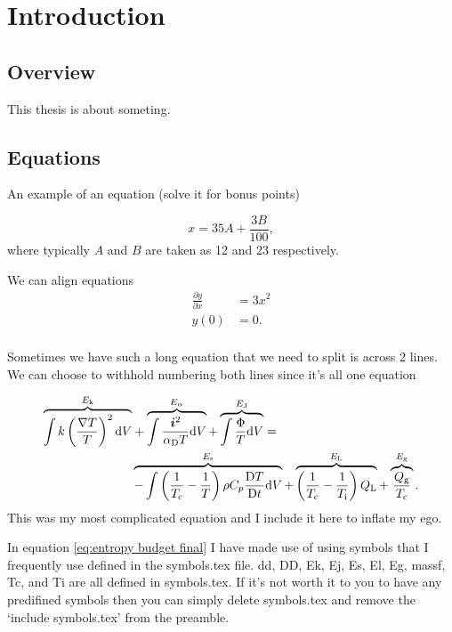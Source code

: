 \chapter[Introduction]{Introduction}  %
\label{ch:introduction}

\section{Overview}

This thesis is about someting.


\section{Equations}

An example of an equation (solve it for bonus points)

\begin{equation}
     x = 35A + \frac{3B}{100},
\end{equation} where typically $A$ and $B$ are taken as 12 and 23 respectively.

We can align equations 
\begin{align}
    \frac{\partial y}{\partial x} &= 3x^2 \\
    y(0) &= 0.\\
\end{align}

Sometimes we have such a long equation that we need to split is across 2 lines. We can choose to withhold numbering both lines since it's all one equation

\begin{align}
    \overbrace{\int k\left(\frac{\nabla T}{T}\right)^2\mathrm{d} V}^{E_{\mathrm{k}}}
    &+ \overbrace{\int\frac{\bm{i}^2}{\alpha_\mathrm{D} T}\mathrm{d} V}^{E_{\alpha}}
    + \overbrace{\int\frac{\Phi}{T} \mathrm{d} V}^{E_{\mathrm{J}}} = \nonumber\\
    & \overbrace{-\int\left(\frac{1}{T_{\mathrm{c}}}-\frac{1}{T}\right)\rho C_p\frac{\mathrm{D} T}{\mathrm{D} t}\mathrm{d} V}^{E_{\mathrm{s}}}
    + \overbrace{\left(\frac{1}{T_{\mathrm{c}}}-\frac{1}{T_{\mathrm{i}}}\right)Q_{\mathrm{L}}}^{E_{\mathrm{L}}}
    + \overbrace{\frac{Q_{\mathrm{g}}}{T_{\mathrm{c}}}}^{E_{\mathrm{g}}}.
\label{eq:entropy budget final}
\end{align}This was my most complicated equation and I include it here to inflate my ego.

In equation \ref{eq:entropy budget final} I have made use of using symbols that I frequently use defined in the symbols.tex file. dd, DD, Ek, Ej, Es, El, Eg, massf, Tc, and Ti are all defined in symbols.tex. If it's not worth it to you to have any predifined symbols then you can simply delete symbols.tex and remove the `include symbols.tex' from the preamble.